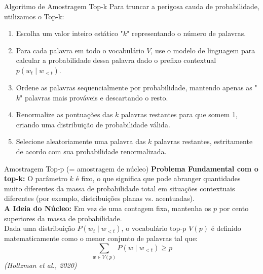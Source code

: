 \documentclass[aspectratio=169]{beamer}
\begin{document}
\begin{frame}{Algoritmo de Amostragem Top-k}\justifying
    Para truncar a perigosa cauda de probabilidade, utilizamos o Top-k:
    \begin{enumerate}
        \item Escolha um valor inteiro estático "$k$" representando o número de palavras.
        \item Para cada palavra em todo o vocabulário $V$, use o modelo de linguagem para calcular a probabilidade dessa palavra dado o prefixo contextual $p(w_t \mid w_{<t})$.
        \item Ordene as palavras sequencialmente por probabilidade, mantendo apenas as "$k$" palavras mais prováveis e descartando o resto.
        \item Renormalize as pontuações das $k$ palavras restantes para que somem 1, criando uma distribuição de probabilidade válida.
        \item Selecione aleatoriamente uma palavra das $k$ palavras restantes, estritamente de acordo com sua probabilidade renormalizada.
    \end{enumerate}
\end{frame}

\begin{frame}{Amostragem Top-p (= amostragem de núcleo)}\justifying
    \textbf{Problema Fundamental com o top-k:} O parâmetro $k$ é fixo, o que significa que pode abranger quantidades muito diferentes da massa de probabilidade total em situações contextuais diferentes (por exemplo, distribuições planas vs. acentuadas). \\
    \vspace{0.3cm}
    \textbf{A Ideia do Núcleo:} Em vez de uma contagem fixa, mantenha os $p$ por cento superiores da massa de probabilidade. \\
    \vspace{0.3cm}
    Dada uma distribuição $P(w_t \mid w_{<t})$, o vocabulário top-p $V(p)$ é definido matematicamente como o menor conjunto de palavras tal que:
    \[ \sum_{w \in V(p)} P(w \mid w_{<t}) \ge p \]
    \vspace{0.3cm}
    \raggedleft \textit{(Holtzman et al., 2020)}
\end{frame}
\end{document}
